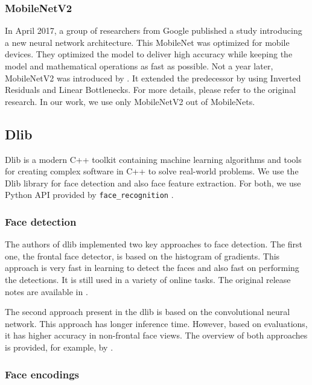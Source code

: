 \subsubsection*{MobileNetV2}

In April 2017, a group of researchers from Google published a study \citep{mobilenet} introducing a new neural network architecture. This MobileNet was optimized for mobile devices. They optimized the model to deliver high accuracy while keeping the model and mathematical operations as fast as possible. Not a year later, MobileNetV2 was introduced by \cite{mobilenetv2}. It extended the predecessor by using Inverted Residuals and Linear Bottlenecks. For more details, please refer to the original research. In our work, we use only MobileNetV2 out of MobileNets.


\subsection{Dlib}
\label{s:dlib}

Dlib \citep{king2009dlib} is a modern C++ toolkit containing machine learning algorithms and tools for creating complex software in C++ to solve real-world problems. We use the Dlib library for face detection and also face feature extraction. For both, we use Python API provided by \verb+face_recognition+ \citep{geitgey2016machine}. 

\subsubsection*{Face detection}

The authors of dlib implemented two key approaches to face detection. The first one, the frontal face detector, is based on the histogram of gradients. This approach is very fast in learning to detect the faces and also fast on performing the detections. It is still used in a variety of online tasks. The original release notes are available in \citep{king2017dlib_hog}.

The second approach present in the dlib is based on the convolutional neural network. This approach has longer inference time. However, based on evaluations, it has higher accuracy in non-frontal face views. The overview of both approaches is provided, for example, by \citep{arun2018cnndlib}.

\subsubsection*{Face encodings}

